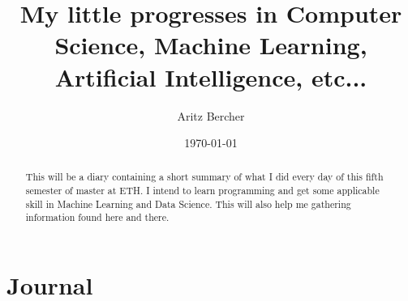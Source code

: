 \documentclass[11pt,a4paper]{article}
\title{My little progresses in Computer Science, Machine Learning, Artificial Intelligence, etc...}
\author{Aritz Bercher}
\date{\today}
\begin{document}
\maketitle

\begin{abstract}
This will be a diary containing a short summary of what I did every day of this fifth semester of master at ETH. I intend to learn programming and get some applicable skill in Machine Learning and Data Science. This will also help me gathering information found here and there.
\end{abstract}

\tableofcontents

\section{Journal}
\end{document}
